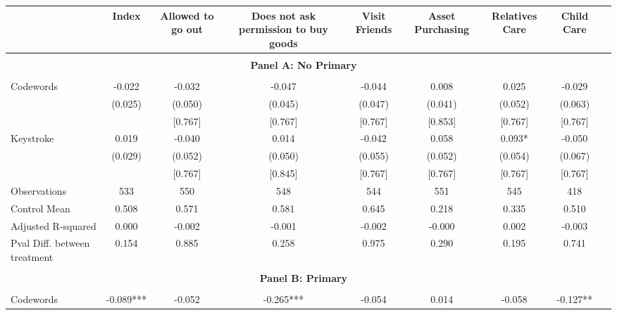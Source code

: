 \begin{tabular}{l*{8}{c}} \hline\hline
                    &\multicolumn{1}{c}{Index}&\multicolumn{1}{c}{Allowed to go out}&\multicolumn{1}{c}{Does not ask permission to buy goods}&\multicolumn{1}{c}{Visit Friends}&\multicolumn{1}{c}{Asset Purchasing}&\multicolumn{1}{c}{Relatives Care}&\multicolumn{1}{c}{Child Care}\\
\hline \\ \multicolumn{8}{c}{\textbf{Panel A: No Primary}} \\\\[-1ex]
Codewords           &      -0.022   &      -0.032   &      -0.047   &      -0.044   &       0.008   &       0.025   &      -0.029   \\
                    &     (0.025)   &     (0.050)   &     (0.045)   &     (0.047)   &     (0.041)   &     (0.052)   &     (0.063)   \\
                    &               &     [0.767]   &     [0.767]   &     [0.767]   &     [0.853]   &     [0.767]   &     [0.767]   \\
Keystroke           &       0.019   &      -0.040   &       0.014   &      -0.042   &       0.058   &       0.093*  &      -0.050   \\
                    &     (0.029)   &     (0.052)   &     (0.050)   &     (0.055)   &     (0.052)   &     (0.054)   &     (0.067)   \\
                    &               &     [0.767]   &     [0.845]   &     [0.767]   &     [0.767]   &     [0.767]   &     [0.767]   \\
\hline
Observations        &         533   &         550   &         548   &         544   &         551   &         545   &         418   \\
Control Mean        &       0.508   &       0.571   &       0.581   &       0.645   &       0.218   &       0.335   &       0.510   \\
Adjusted R-squared  &       0.000   &      -0.002   &      -0.001   &      -0.002   &      -0.000   &       0.002   &      -0.003   \\
Pval Diff. between treatment&       0.154   &       0.885   &       0.258   &       0.975   &       0.290   &       0.195   &       0.741   \\
\hline \\ \multicolumn{8}{c}{\textbf{Panel B: Primary}} \\\\[-1ex]
Codewords           &      -0.089***&      -0.052   &      -0.265***&      -0.054   &       0.014   &      -0.058   &      -0.127** \\

\end{tabular}
